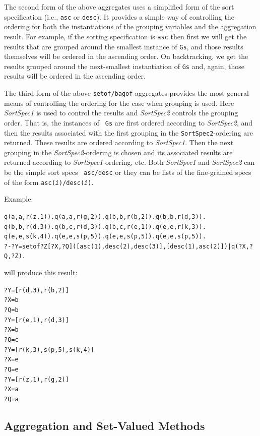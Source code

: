 \documentclass[11pt]{article}
\begin{document}
The second form of the above aggregates uses a simplified form of the sort
specification (i.e., {\tt asc} or {\tt desc}). It provides a simple way of
controlling the ordering for both the instantiations of the grouping variables  
and the aggregation result. For example, if the sorting specification is
{\tt asc} then first we will get the results that are grouped around the
smallest instance of {\tt Gs}, and those results themselves will be ordered
in the ascending order. On backtracking, we get the results grouped around
the next-smallest instantiation of {\tt Gs} and, again, those results will
be ordered in the ascending order.

The third form of the above {\tt setof/bagof} aggregates provides the most
general means of controlling the ordering for the case when grouping is
used. Here {\it SortSpec1} is used to control the results and {\it
  SortSpec2} controls the grouping order.  That is, the instances of {\tt
  Gs} are first ordered according to {\it SortSpec2}, and then the results
associated with the first grouping in the {\tt SortSpec2}-ordering are
returned. These results are ordered according to {\it SortSpec1}. Then the
next grouping in the \emph{SortSpec2}-ordering is chosen and its associated
results are returned according to {\it SortSpec1}-ordering, etc. 
Both {\it SortSpec1} and {\it SortSpec2} can be the simple sort specs {\tt
  asc/desc}  or they can be lists of the
fine-grained specs of the form
{\tt asc({\it i})/desc({\it i})}.

\noindent
Example:
\begin{alltt}
  q(a,a,r(z,1)). q(a,a,r(g,2)). q(b,b,r(b,2)). q(b,b,r(d,3)).
  q(b,b,r(d,3)). q(b,c,r(d,3)). q(b,c,r(e,1)). q(e,e,r(k,3)).
  q(e,e,s(k,4)). q(e,e,s(p,5)). q(e,e,s(p,5)). q(e,e,s(p,5)).\vspace{2mm}
  ?- ?Y = setof{?Z[?X,?Q]([asc(1),desc(2),desc(3)],[desc(1),asc(2)])|q(?X,?Q,?Z)}.
\end{alltt}
will produce this result:
\begin{alltt}
  ?Y = [r(d,3), r(b,2)]
  ?X = b
  ?Q = b \vspace{2mm}
  ?Y = [r(e,1), r(d,3)]
  ?X = b
  ?Q = c \vspace{2mm}
  ?Y = [r(k,3), s(p,5), s(k,4)]
  ?X = e
  ?Q = e \vspace{2mm}
  ?Y = [r(z,1), r(g,2)]
  ?X = a
  ?Q = a
\end{alltt}


\subsection {Aggregation and Set-Valued Methods}
\end{document}
